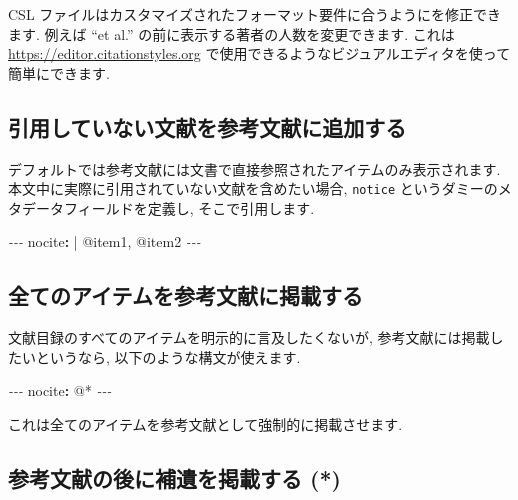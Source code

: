 \documentclass[
  11pt,
]{bxjsreport}
\newenvironment{Shaded}{\begin{snugshade}}{\end{snugshade}}
\newcommand{\AttributeTok}[1]{\textcolor[rgb]{0.77,0.63,0.00}{#1}}
\newcommand{\CharTok}[1]{\textcolor[rgb]{0.31,0.60,0.02}{#1}}
\newcommand{\FunctionTok}[1]{\textcolor[rgb]{0.00,0.00,0.00}{#1}}
\newcommand{\KeywordTok}[1]{\textcolor[rgb]{0.13,0.29,0.53}{\textbf{#1}}}
\newcommand{\NormalTok}[1]{#1}
\newcommand{\PreprocessorTok}[1]{\textcolor[rgb]{0.56,0.35,0.01}{\textit{#1}}}
\newcommand{\StringTok}[1]{\textcolor[rgb]{0.31,0.60,0.02}{#1}}
\begin{document}
CSL ファイルはカスタマイズされたフォーマット要件に合うようにを修正できます. 例えば ``et al.'' の前に表示する著者の人数を変更できます. これは \url{https://editor.citationstyles.org} で使用できるようなビジュアルエディタを使って簡単にできます.

\hypertarget{add-an-item-to-a-bibliography-without-using-it}{%
\subsection{引用していない文献を参考文献に追加する}\label{add-an-item-to-a-bibliography-without-using-it}}

デフォルトでは参考文献には文書で直接参照されたアイテムのみ表示されます. 本文中に実際に引用されていない文献を含めたい場合, \texttt{notice} というダミーのメタデータフィールドを定義し, そこで引用します.

\begin{Shaded}
\begin{Highlighting}[]
\PreprocessorTok{{-}{-}{-}}
\FunctionTok{nocite}\KeywordTok{: }\CharTok{|}
\NormalTok{  @item1, @item2}
\PreprocessorTok{{-}{-}{-}}
\end{Highlighting}
\end{Shaded}

\hypertarget{add-all-items-to-the-bibliography}{%
\subsection{全てのアイテムを参考文献に掲載する}\label{add-all-items-to-the-bibliography}}

文献目録のすべてのアイテムを明示的に言及したくないが, 参考文献には掲載したいというなら, 以下のような構文が使えます.

\begin{Shaded}
\begin{Highlighting}[]
\PreprocessorTok{{-}{-}{-}}
\FunctionTok{nocite}\KeywordTok{:}\AttributeTok{ }\StringTok{\textquotesingle{}@*\textquotesingle{}}
\PreprocessorTok{{-}{-}{-}}
\end{Highlighting}
\end{Shaded}

これは全てのアイテムを参考文献として強制的に掲載させます.

\hypertarget{include-appendix-after-bibliography}{%
\subsection{参考文献の後に補遺を掲載する (*)}\label{include-appendix-after-bibliography}}
\end{document}

